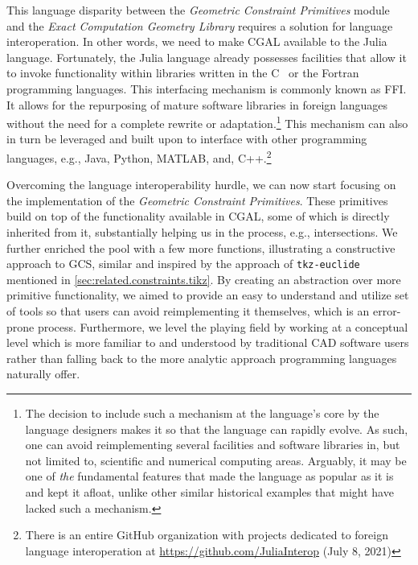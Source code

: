 This language disparity between the \textit{Geometric Constraint Primitives}
module and the \textit{Exact Computation Geometry Library} requires a solution
for language interoperation.  In other words, we need to make \ac{CGAL}
available to the Julia language.  Fortunately, the Julia language already
possesses facilities that allow it to invoke functionality within libraries
written in the C~\cite{Kernighan:1988:C} or the
Fortran~\cite{Backus:1957:Fortran} programming languages.  This interfacing
mechanism is commonly known as \ac{FFI}.  It allows for the repurposing of
mature software libraries in foreign languages without the need for a complete
rewrite or adaptation.\footnote{The decision to include such a mechanism at the
language's core by the language designers makes it so that the language can
rapidly evolve. As such, one can avoid reimplementing several facilities and
software libraries in, but not limited to, scientific and numerical computing
areas.  Arguably, it may be one of \textit{the} fundamental features that made
the language as popular as it is and kept it afloat, unlike other similar
historical examples that might have lacked such a mechanism.}  This mechanism
can also in turn be leveraged and built upon to interface with other programming
languages, e.g., Java, Python, MATLAB, and, C++.\footnote{There is an entire
GitHub organization with projects dedicated to foreign language interoperation
at \url{https://github.com/JuliaInterop} (July 8, 2021)}

Overcoming the language interoperability hurdle, we can now start focusing on
the implementation of the \textit{Geometric Constraint Primitives}.  These
primitives build on top of the functionality available in \ac{CGAL}, some of
which is directly inherited from it, substantially helping us in the process,
e.g., intersections.  We further enriched the pool with a few more functions,
illustrating a constructive approach to \ac{GCS}, similar and inspired by the
approach of \texttt{tkz-euclide} mentioned in
\cref{sec:related.constraints.tikz}.  By creating an abstraction over more
primitive functionality, we aimed to provide an easy to understand and utilize
set of tools so that users can avoid reimplementing it themselves, which is an
error-prone process.  Furthermore, we level the playing field by working at a
conceptual level which is more familiar to and understood by traditional
\ac{CAD} software users rather than falling back to the more analytic approach
programming languages naturally offer.

